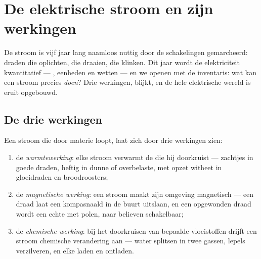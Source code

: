 \chapter{De elektrische stroom en zijn werkingen}\label{ch:g8:electric-current-effects}

De stroom is vijf jaar lang naamloos nuttig door de schakelingen
gemarcheerd: draden die oplichten,  die draaien, 
die klinken. Dit jaar wordt de elektriciteit kwantitatief --- ,
eenheden en wetten --- en we openen met de inventaris: wat kan
een stroom precies \emph{doen}? Drie werkingen, blijkt, en de hele
elektrische wereld is eruit opgebouwd.

\section{De drie werkingen}

\begin{proposition}\label{prop:g8:electric-current-effects:three}
Een stroom die door materie loopt, laat zich door drie werkingen zien:
\begin{enumerate}
  \item de \emph{warmtewerking}: elke stroom
        verwarmt de  die hij doorkruist --- zachtjes in
        goede draden, heftig in dunne of overbelaste, met opzet
        witheet in gloeidraden en broodroosters;
  \item de \emph{magnetische werking}: een
        stroom maakt zijn omgeving magnetisch --- een draad laat een
        kompasnaald in de buurt uitslaan, en een opgewonden draad
        wordt een echte  met polen, naar believen
        schakelbaar;
  \item de \emph{chemische werking}: bij het
        doorkruisen van bepaalde vloeistoffen drijft een stroom
        chemische verandering aan --- water splitsen in twee gassen,
        lepels verzilveren, en elke  laden en ontladen.
\end{enumerate}
\end{proposition}

